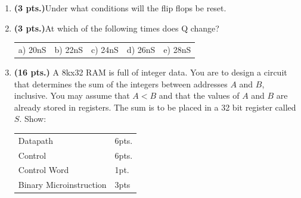 \documentclass{article}
\begin{document}
\begin{enumerate}
\item {\bf (3 pts.)}Under what conditions will the flip flops be reset.

\item {\bf (3 pts.)}At which of the following times does Q change?

\begin{tabular}{p{0.75in}p{0.75in}p{0.75in}p{0.75in}p{0.75in}}
a) 20nS  & b) 22nS  & c) 24nS & d) 26nS & e) 28nS \\
\end{tabular}

\pagebreak
\item {\bf (16 pts.)} A 8kx32 RAM is full of integer data.  You are to 
design a circuit that determines the sum of the integers between
addresses $A$ and $B$, inclusive.  You may assume that $A<B$ and that the 
values of $A$ and $B$ are already stored in registers.  The sum 
is to be placed in a 32 bit register called $S$.  Show:

\begin{tabular}{p{1.50in}p{0.25in}}
Datapath	& 6pts. \\
Control		& 6pts. \\
Control Word	& 1pt. \\
Binary Microinstruction & 3pts \\
\end{tabular}

\pagebreak


\end{enumerate}
\end{document}
